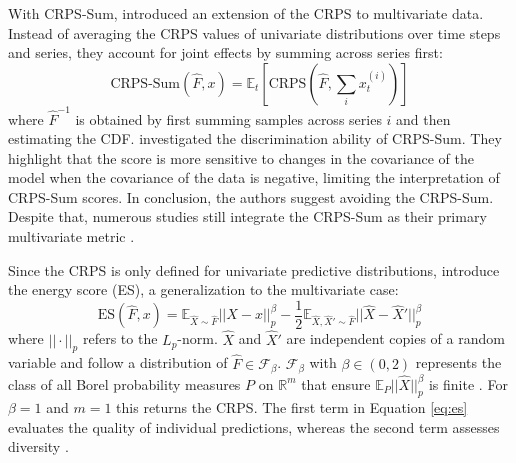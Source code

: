 \documentclass[a4paper,oneside,bibliography=totoc]{scrbook}
\begin{document}
\noindent
With CRPS-Sum, \citet{salinas_high-dimensional_2019} introduced an extension of the CRPS to multivariate data. Instead of averaging the CRPS values of univariate distributions over time steps and series, they account for joint effects by summing across series first:
\begin{equation}
    \text{CRPS-Sum}(\hat{F}, x) = \mathbb{E}_t[\text{CRPS}(\hat{F}, \sum_i x^{(i)}_{t})]
    \label{eq:crps_sum}
\end{equation}
where $\hat{F}^{-1}$ is obtained by first summing samples across series $i$ and then estimating the CDF. \citet{koochali_random_2022} investigated the discrimination ability of CRPS-Sum. They highlight that the score is more sensitive to changes in the covariance of the model when the covariance of the data is negative, limiting the interpretation of CRPS-Sum scores. 
In conclusion, the authors 
suggest avoiding the CRPS-Sum.
Despite that, numerous studies still integrate the CRPS-Sum as their primary multivariate metric \cite{feng_latent_2024, zheng_multivariate_2024, zhang_probts_2024, feng_multi-scale_2024}.
\newline

\noindent
Since the CRPS is only defined for univariate predictive distributions, \citet{gneiting_strictly_2007} introduce the energy score (ES), a generalization to the multivariate case:
\begin{equation}
    \text{ES}(\hat{F}, x) = \mathbb{E}_{\hat{X} \sim \hat{F}}||\hat{X}-x||_p^\beta-\frac{1}{2} \mathbb{E}_{\hat{X}, \hat{X}' \sim \hat{F}}||\hat{X}-\hat{X}'||_p^\beta
    \label{eq:es}
\end{equation}
where $||\cdot||_p$ refers to the $L_p$-norm. 
$\hat{X}$ and $\hat{X}'$ are independent copies of a random variable and follow a distribution of $\hat{F}\in \mathcal{F}_\beta$. 
$\mathcal{F}_\beta$ with $\beta \in (0, 2)$ represents the class of all Borel probability measures $P$ on $\mathbb{R}^m$ that ensure $\mathbb{E}_P||\hat{X}||_p^\beta$ is finite \cite{gneiting_strictly_2007}. For $\beta=1$ and $m=1$ this returns the CRPS. The first term in Equation \ref{eq:es} evaluates the quality of individual predictions, whereas the second term assesses diversity \cite{shahroudi_evaluation_2024}.  
\newline
\end{document}
